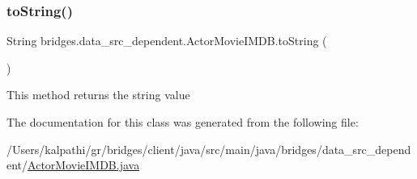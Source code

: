 \subsubsection{\texorpdfstring{to\+String()}{toString()}}
{\footnotesize\ttfamily String bridges.\+data\+\_\+src\+\_\+dependent.\+Actor\+Movie\+I\+M\+D\+B.\+to\+String (\begin{DoxyParamCaption}{ }\end{DoxyParamCaption})}

This method returns the string value 

The documentation for this class was generated from the following file\+:\begin{DoxyCompactItemize}
\item 
/\+Users/kalpathi/gr/bridges/client/java/src/main/java/bridges/data\+\_\+src\+\_\+dependent/\mbox{\hyperlink{_actor_movie_i_m_d_b_8java}{Actor\+Movie\+I\+M\+D\+B.\+java}}\end{DoxyCompactItemize}
